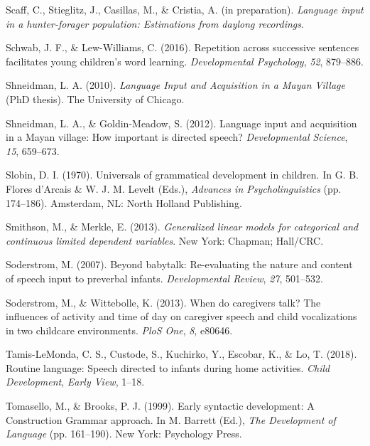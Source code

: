 \documentclass[floatsintext,man]{apa6}
\theoremstyle{definition}
\theoremstyle{definition}
\theoremstyle{definition}
\theoremstyle{remark}
\begin{document}
\hypertarget{ref-scaffIPlanguage}{}
Scaff, C., Stieglitz, J., Casillas, M., \& Cristia, A. (in preparation).
\emph{Language input in a hunter-forager population: Estimations from
daylong recordings}.

\hypertarget{ref-schwab2016repetition}{}
Schwab, J. F., \& Lew-Williams, C. (2016). Repetition across successive
sentences facilitates young children's word learning.
\emph{Developmental Psychology}, \emph{52}, 879--886.

\hypertarget{ref-shneidman2010language}{}
Shneidman, L. A. (2010). \emph{Language Input and Acquisition in a Mayan
Village} (PhD thesis). The University of Chicago.

\hypertarget{ref-shneidman2012language}{}
Shneidman, L. A., \& Goldin-Meadow, S. (2012). Language input and
acquisition in a Mayan village: How important is directed speech?
\emph{Developmental Science}, \emph{15}, 659--673.

\hypertarget{ref-slobin1970universals}{}
Slobin, D. I. (1970). Universals of grammatical development in children.
In G. B. Flores d'Arcais \& W. J. M. Levelt (Eds.), \emph{Advances in
Psycholinguistics} (pp. 174--186). Amsterdam, NL: North Holland
Publishing.

\hypertarget{ref-smithson2013generalized}{}
Smithson, M., \& Merkle, E. (2013). \emph{Generalized linear models for
categorical and continuous limited dependent variables}. New York:
Chapman; Hall/CRC.

\hypertarget{ref-soderstrom2007beyond}{}
Soderstrom, M. (2007). Beyond babytalk: Re-evaluating the nature and
content of speech input to preverbal infants. \emph{Developmental
Review}, \emph{27}, 501--532.

\hypertarget{ref-soderstrom2013when}{}
Soderstrom, M., \& Wittebolle, K. (2013). When do caregivers talk? The
influences of activity and time of day on caregiver speech and child
vocalizations in two childcare environments. \emph{PloS One}, \emph{8},
e80646.

\hypertarget{ref-tamislemonda2018routine}{}
Tamis-LeMonda, C. S., Custode, S., Kuchirko, Y., Escobar, K., \& Lo, T.
(2018). Routine language: Speech directed to infants during home
activities. \emph{Child Development}, \emph{Early View}, 1--18.

\hypertarget{ref-tomasello1999early}{}
Tomasello, M., \& Brooks, P. J. (1999). Early syntactic development: A
Construction Grammar approach. In M. Barrett (Ed.), \emph{The
Development of Language} (pp. 161--190). New York: Psychology Press.
\end{document}
